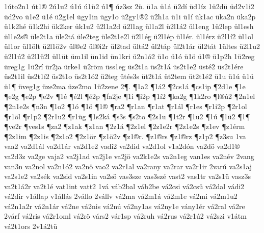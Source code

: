 {1^^fato2n1
^^fat1^^ae
2^^fa1u2
^^fa1^^fa
^^fa1^^fc2
^^fa1^^b6
^^faz3sz
2^^fc.
^^fc1a
^^fc1^^e1
^^fc2d^^ed
^^fcd1^^edz
1^^fc2d^^fc
^^fcd2v1i2
^^fcd2vo
^^fc1e2
^^fc1^^e9
^^fc2g1el
^^fcgy1in
^^fcgy1o
^^fc2gy1^^ae2
^^fc2h1a
^^fc1i
^^fc1^^ed
^^fck1ac
^^fcka2n
^^fcka2p
^^fc1k2h^^e9
^^fc1k2hi
^^fck2ker
^^fck1u2
^^fc2l1a2d
^^fc2l1ag
^^fcl1a2l
^^fc2l1^^e12
^^fcl1eng
1^^fc2lep
^^fcl1esh
^^fcl1e2s^^ae
^^fcle2t1a
^^fcle2t^^e1
^^fcle2teg
^^fcle2t1e2l
^^fc2l1^^e9g
^^fc2l1^^e9p
^^fcl1^^e9r.
^^fcl1^^e9rz
^^fc2l1^^ed2
^^fcl1ol
^^fcl1or
^^fcl1^^f6lt
^^fc2l1^^f62v
^^fcl^^aee2
^^fcl^^aei2r
^^fcl2tad
^^fclt^^e12
^^fcl2t^^e1p
^^fcl2t1^^e1r
^^fcl2t^^e1t
1^^fcltes
^^fc2l1u2
^^fc2l1^^fa2
^^fc2l1^^fc2l
^^fcl1^^fct
^^fcm1il
^^fcn1id
^^fcn1kri
^^fc2n1^^f32
^^fc1o
^^fc1^^f3
^^fc1^^f6
^^fc1^^ae
^^fc1p2h
1^^fc2reg
^^fcreg1g
1^^fc2r^^ed
^^fcr2ja
^^fcrke1
^^fc2r^^f6m
^^fcss1eg
^^fcs2t1a
^^fcs2t1^^e1
^^fcs2t1e2
^^fcst^^e92
^^fcs2t1^^e9re
^^fcs2t1il
^^fcs2t1^^ed2
^^fcs2t1o
^^fcs2t1^^f32
^^fc2teg
^^fct^^e9s3s
^^fct2t1^^e1
^^fct2tem
^^fct2t1^^e92
^^fc1u
^^fc1^^fa
^^fc1^^fc
^^fc1^^b6
^^fcveg1g
^^fcze2ma
^^fcze2mo
1^^fc2zene
2^^b6.
^^b61a2
^^b61^^e12
^^b62cs1^^e1
^^b6cs1ip
^^b62d1e
^^b61e
^^b6e2g
^^b6e2p
^^b6e2v
^^b61^^e9
^^b6^^e92l
^^b6^^e92p
^^b6fa2je
^^b61i
^^b6i2p
^^b61^^ed2
^^b6ka2g
^^b61k2ro
^^b6l^^ae^^fa2
^^b62n1el
^^b62n1e2s
^^b6n3n
^^b61o2
^^b61^^f3
^^b61^^f6
^^b61^^ae
^^b6ra2
^^b6r1an
^^b6r1at
^^b6r1^^e1l
^^b6r1es
^^b6r1i2p
^^b62r1ol
^^b6r1^^f6l
^^b6r1p2
^^b62r1u2
^^b6r1^^fcg
^^b61s2k^^e1
^^b6s3s
^^b6s2to
^^b62s1u
^^b61t2r
^^b61u2
^^b61^^fa
^^b61^^fc2
^^b61^^b6
^^b6ve2r
^^b6ves1s
^^b6za2
^^b6z1ak
^^b6z1an
^^b62z1^^e1
^^b62z1el
^^b62z1e2r
^^b62z1e2s
^^b6z1ev
^^b6z1^^e9rm
^^b62z1im
^^b62z1is
^^b62z1o2
^^b62z1^^f6r
^^b6z1^^f62v
^^b6z1^^aer.
^^b6z1^^aers
^^b6z1^^aerz
^^b6z1p2
^^b6z3su
1va
vaa2
va2d1^^e1l
va2d1^^e1r
va2d1e2
vadi2
va2did
va2d1ol
v1a2d^^f3n
va2d^^f6
va2d1^^ae
va2d3z
va2ge
vaja2
va2j1ad
va2j1e
va2j^^f6
va2k1e2s
va2n1eg
van1es
va2n^^e9v
2vang
van3n
va2nol
va2n1^^f32
va2n^^f6
vao2
va2r1al
va2rany
va2rar
va2r1ir
2var^^fa
va2s1aj
va2s1e2
va2s^^e9k
va2sid
va2s1in
va2s^^f6
vas3sze
vas3sz^^e9
vast2
vas1tr
va2s1^^fc
vasz3s
va2t1^^e12r
va2t1^^e9
vat1int
vatt2
1v^^e1
v^^e1b2bal
v^^e1b2be
v^^e12csi
v^^e12cs^^fc
v^^e12dal
v^^e1di2
v^^e12dir
v1^^e1llap
v1^^e1ll^^e1s
2v^^e1llo
2v^^e1llv
v^^e12ma
v^^e12m1^^e1
v^^e12m1e
v^^e12mi
v^^e12m1u2
v^^e12n1a2r
v^^e12n1^^e1r
v^^e12ne
v^^e12nis
v^^e12n^^fa
v^^e12ny1as
v^^e12ny1e
v^^e1ny1^^e9r
v^^e12ral
v^^e12re
2v^^e1rf
v^^e12ris
v^^e12r1oml
v^^e12r^^f6
v^^e1rs2
v^^e1r1sp
v^^e12ruh
v^^e12rus
v^^e12r1^^fa2
v^^e12szi
v1^^e1tm
v^^e12t1ors
2v1^^e12t^^fc
}
